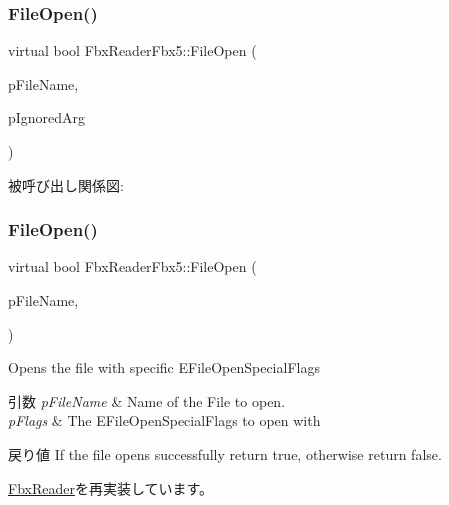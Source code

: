 \subsubsection{\texorpdfstring{File\+Open()}{FileOpen()}\hspace{0.1cm}{\footnotesize\ttfamily [1/5]}}
{\footnotesize\ttfamily virtual bool Fbx\+Reader\+Fbx5\+::\+File\+Open (\begin{DoxyParamCaption}\item[{char $\ast$}]{p\+File\+Name,  }\item[{bool}]{p\+Ignored\+Arg }\end{DoxyParamCaption})\hspace{0.3cm}{\ttfamily [virtual]}}

被呼び出し関係図\+:
\mbox{\label{class_fbx_reader_fbx5_aa197089a894684834388a2caf43145e3}} 
\subsubsection{\texorpdfstring{File\+Open()}{FileOpen()}\hspace{0.1cm}{\footnotesize\ttfamily [2/5]}}
{\footnotesize\ttfamily virtual bool Fbx\+Reader\+Fbx5\+::\+File\+Open (\begin{DoxyParamCaption}\item[{char $\ast$}]{p\+File\+Name,  }\item[{\hyperlink{class_fbx_reader_a1a14bd907bcda7dd48ba9b0a6236b7b8}{E\+File\+Open\+Special\+Flags}}]{ }\end{DoxyParamCaption})\hspace{0.3cm}{\ttfamily [virtual]}}

Opens the file with specific E\+File\+Open\+Special\+Flags 
\begin{DoxyParams}{引数}
{\em p\+File\+Name} & Name of the File to open. \\
\hline
{\em p\+Flags} & The E\+File\+Open\+Special\+Flags to open with \\
\hline
\end{DoxyParams}
\begin{DoxyReturn}{戻り値}
If the file opens successfully return true, otherwise return false. 
\end{DoxyReturn}


\hyperlink{class_fbx_reader_a345b292805ea8799a9d962714e1ad9a5}{Fbx\+Reader}を再実装しています。

